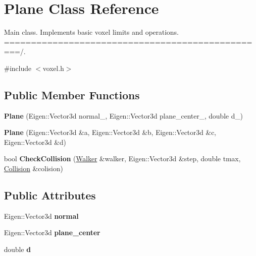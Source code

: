 \hypertarget{class_plane}{}\section{Plane Class Reference}
\label{class_plane}


Main class. Implements basic voxel limits and operations. =================================================/.  




{\ttfamily \#include $<$voxel.\+h$>$}

\subsection*{Public Member Functions}
\begin{DoxyCompactItemize}
\item 
\mbox{\label{class_plane_a8b1516b02b3ab4bdfe48234db82da168}} 
{\bfseries Plane} (Eigen\+::\+Vector3d normal\+\_\+, Eigen\+::\+Vector3d plane\+\_\+center\+\_\+, double d\+\_\+)
\item 
\mbox{\label{class_plane_a942208920a6e4762e3dc9aab76305667}} 
{\bfseries Plane} (Eigen\+::\+Vector3d \&a, Eigen\+::\+Vector3d \&b, Eigen\+::\+Vector3d \&c, Eigen\+::\+Vector3d \&d)
\item 
\mbox{\label{class_plane_a1a4e24c5ca029ceb787f291a11adac8f}} 
bool {\bfseries Check\+Collision} (\hyperlink{class_walker}{Walker} \&walker, Eigen\+::\+Vector3d \&step, double tmax, \hyperlink{class_collision}{Collision} \&colision)
\end{DoxyCompactItemize}
\subsection*{Public Attributes}
\begin{DoxyCompactItemize}
\item 
\mbox{\label{class_plane_a229ee65fd1663c7e7bd101309ddcf5e0}} 
Eigen\+::\+Vector3d {\bfseries normal}
\item 
\mbox{\label{class_plane_a20cfe0415a4f25f03d2d639ae9a647e9}} 
Eigen\+::\+Vector3d {\bfseries plane\+\_\+center}
\item 
\mbox{\label{class_plane_a13e69abc574bead3f8f450bbe2b43cf9}} 
double {\bfseries d}
\end{DoxyCompactItemize}


